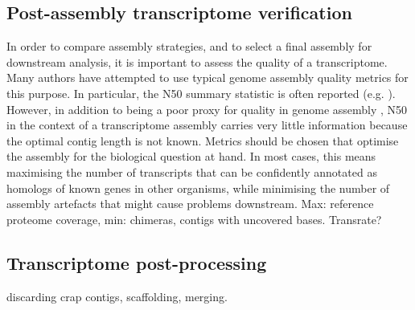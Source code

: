 \subsection{Post-assembly transcriptome verification}
In order to compare assembly strategies, and to select a final assembly for downstream analysis, it is important to assess the quality of a transcriptome. Many authors have attempted to use typical genome assembly quality metrics for this purpose. In particular, the N50 summary statistic is often reported (e.g. \citep{Hiz:2014ep,Shinzato:2014hx,Liang:2013fm}). However, in addition to being a poor proxy for quality in genome assembly \citep{Bradnam:2013uua}, N50 in the context of a transcriptome assembly carries very little information because the optimal contig length is not known. Metrics should be chosen that optimise the assembly for the biological question at hand. In most cases, this means maximising the number of transcripts that can be confidently annotated as homologs of known genes in other organisms, while minimising the number of assembly artefacts that might cause problems downstream. Max: reference proteome coverage, min: chimeras, contigs with uncovered bases. Transrate?

\subsection{Transcriptome post-processing}
discarding crap contigs, scaffolding, merging.